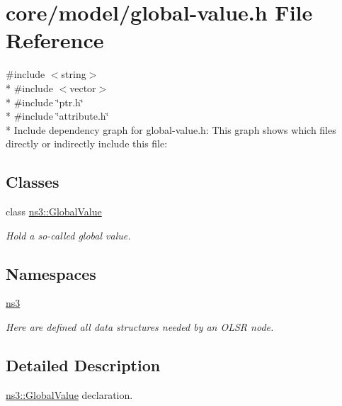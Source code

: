 \hypertarget{global-value_8h}{}\section{core/model/global-\/value.h File Reference}
\label{global-value_8h}
{\ttfamily \#include $<$string$>$}\\*
{\ttfamily \#include $<$vector$>$}\\*
{\ttfamily \#include \char`\"{}ptr.\+h\char`\"{}}\\*
{\ttfamily \#include \char`\"{}attribute.\+h\char`\"{}}\\*
Include dependency graph for global-\/value.h\+:
This graph shows which files directly or indirectly include this file\+:
\subsection*{Classes}
\begin{DoxyCompactItemize}
\item 
class \hyperlink{classns3_1_1GlobalValue}{ns3\+::\+Global\+Value}
\begin{DoxyCompactList}\small\item\em Hold a so-\/called \textquotesingle{}global value\textquotesingle{}. \end{DoxyCompactList}\end{DoxyCompactItemize}
\subsection*{Namespaces}
\begin{DoxyCompactItemize}
\item 
 \hyperlink{namespacens3}{ns3}
\begin{DoxyCompactList}\small\item\em Here are defined all data structures needed by an O\+L\+SR node. \end{DoxyCompactList}\end{DoxyCompactItemize}


\subsection{Detailed Description}
\hyperlink{classns3_1_1GlobalValue}{ns3\+::\+Global\+Value} declaration. 